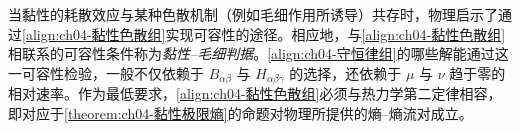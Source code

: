 \documentclass[../../main.tex]{subfiles}
\begin{document}
当黏性的耗散效应与某种色散机制（例如毛细作用所诱导）共存时，物理启示了通过\eqref{align:ch04-黏性色散组}实现可容性的途径。相应地，与\eqref{align:ch04-黏性色散组}相联系的可容性条件称为\emph{黏性--毛细判据}。\eqref{align:ch04-守恒律组}的哪些解能通过这一可容性检验，一般不仅依赖于 $B_{\alpha\beta}$ 与 $H_{\alpha\beta\gamma}$ 的选择，还依赖于 $\mu$ 与 $\nu$ 趋于零的相对速率。作为最低要求，\eqref{align:ch04-黏性色散组}必须与热力学第二定律相容，即对应于\cref{theorem:ch04-黏性极限熵}的命题对物理所提供的熵--熵流对成立。
\end{document}
